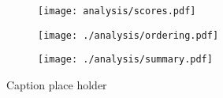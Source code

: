 \begin{figure*}
    \centering
    \begin{subfigure}[t]{\textwidth}
        \centering
        \texttt{[image: analysis/scores.pdf]}
    \end{subfigure}%
     
    \begin{subfigure}[h]{0.45\textwidth}
        \texttt{[image: ./analysis/ordering.pdf]}
    \end{subfigure}
    \begin{subfigure}[h]{0.45\textwidth}
        \texttt{[image: ./analysis/summary.pdf]}
    \end{subfigure}
    \caption{Caption place holder}
\end{figure*}
